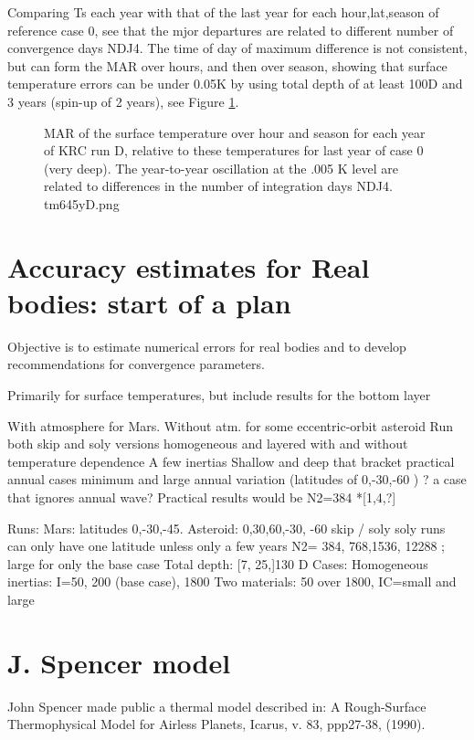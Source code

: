 \documentclass{article}
\begin{document}
Comparing Ts each year with that of the last year for each hour,lat,season of reference case 0, see that the mjor departures are related to different number of convergence days NDJ4.
 The time of day of maximum difference is not consistent, but can form the MAR over hours, and then over season, showing that surface temperature errors can be under 0.05K by using total depth of at least 100D and 3 years (spin-up of 2 years), see Figure \ref{tm645yD}.

\begin{figure}[!ht] 
\caption[ Surface temperature MAR]{MAR of the surface temperature over hour and season for each year of KRC run D, relative to these temperatures for last year of case 0 (very deep). The year-to-year oscillation at the .005 K level are related to differences in the number of integration days NDJ4.  
\label{tm645yD}  tm645yD.png }
\end{figure} 


\clearpage

\section{Accuracy estimates for Real bodies: start of a plan}

Objective is to estimate numerical errors for real bodies and to develop recommendations for convergence parameters. 

Primarily for surface temperatures, but include results for the bottom layer

With atmosphere for Mars. Without atm. for some eccentric-orbit asteroid
\qi Run both skip and soly versions
\qi  homogeneous and layered
\qi  with and without temperature dependence
\qi A few inertias
\qi Shallow and deep that bracket practical annual cases
\qi minimum and large annual variation (latitudes of 0,-30,-60 )
\qi ? a case that ignores annual wave?
\qi Practical results would be N2=384 *[1,4,?]

Runs: 
\qi    Mars: latitudes 0,-30,-45.  Asteroid: 0,30,60,-30, -60
\qi   skip / soly 
\qii  soly runs can only have one latitude unless only a few years
\qi  N2= 384, 768,1536, 12288 ; large for only the base case
\qii Total depth: [7, 25,]130 D
\qi Cases: 
\qii  Homogeneous inertias: I=50, 200 (base case), 1800
\qii  Two materials: 50 over 1800, IC=small and large

\section{J. Spencer model}
John Spencer made public a thermal model described in:  
A Rough-Surface Thermophysical Model for Airless Planets, Icarus, v. 83, ppp27-38, (1990). 
\end{document}
